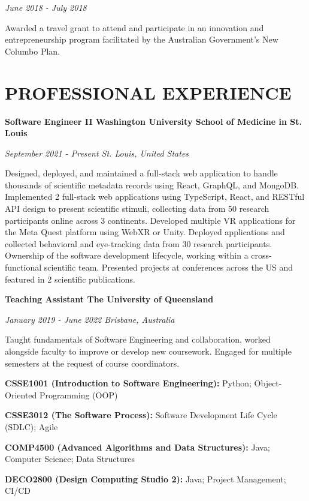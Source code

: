 \documentclass{article}
\begin{document}
  \textit{June 2018 - July 2018}

  Awarded a travel grant to attend and participate in an innovation and entrepreneurship program facilitated by the Australian Government's New Columbo Plan.


  \section*{\centering\uppercase{Professional Experience}}

  {\large\textbf{Software Engineer II \hfill Washington University School of Medicine in St. Louis}}

  \textit{September 2021 - Present \hfill St. Louis, United States}

Designed, deployed, and maintained a full-stack web application to handle thousands of scientific metadata records using React, GraphQL, and MongoDB. Implemented 2 full-stack web applications using TypeScript, React, and RESTful API design to present scientific stimuli, collecting data from 50 research participants online across 3 continents. Developed multiple VR applications for the Meta Quest platform using WebXR or Unity. Deployed applications and collected behavioral and eye-tracking data from 30 research participants. Ownership of the software development lifecycle, working within a cross-functional scientific team. Presented projects at conferences across the US and featured in 2 scientific publications.

  \smallbreak

  {\large\textbf{Teaching Assistant \hfill The University of Queensland}}

  \textit{January 2019 - June 2022 \hfill Brisbane, Australia}

Taught fundamentals of Software Engineering and collaboration, worked alongside faculty to improve or develop new coursework. Engaged for multiple semesters at the request of course coordinators.

  \textbf{CSSE1001 (Introduction to Software Engineering):} Python; Object-Oriented Programming (OOP)

  \textbf{CSSE3012 (The Software Process):} Software Development Life Cycle (SDLC); Agile

  \textbf{COMP4500 (Advanced Algorithms and Data Structures):} Java; Computer Science; Data Structures

  \textbf{DECO2800 (Design Computing Studio 2):} Java; Project Management; CI/CD
\end{document}

